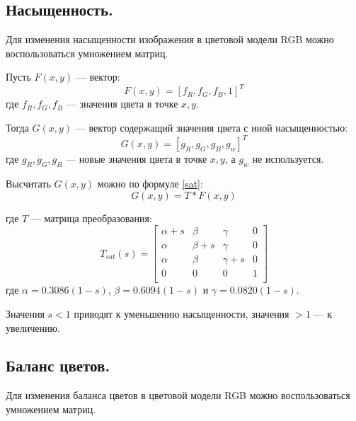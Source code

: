 \newpage


\subsection{Насыщенность.}

Для изменения насыщенности изображения в цветовой модели RGB можно воспользоваться умножением матриц.

Пусть $F(x,y)$ --- вектор:
\begin{equation}
	\label{F}
	F(x,y) = [f_R, f_G, f_B, 1]^T
\end{equation}
где $f_R, f_G, f_B$ --- значения цвета в точке $x,y$.

Тогда $G(x,y)$ --- вектор содержащий значения цвета с иной насыщенностью:
\begin{equation}
	\label{G}
	G(x,y) = [g_R, g_G, g_B, g_w]^T
\end{equation}
где $g_R, g_G, g_B$ --- новые значения цвета в точке $x,y$, а $g_w$ не используется.

Высчитать $G(x,y)$ можно по формуле \ref{sat}:
\begin{equation}
	\label{sat}
	G(x,y) = T * F(x,y)
\end{equation}

где $T$ --- матрица преобразования:
\begin{equation}
	\label{tsat}
	T_{sat}(s) = \begin{bmatrix}
					\alpha + s & \beta & \gamma & 0\\
				    \alpha & \beta + s & \gamma & 0 \\ 
					\alpha & \beta & \gamma + s & 0 \\ 
					0 & 0 & 0 & 1 \\ 
				\end{bmatrix}
\end{equation}
где $\alpha = 0.3086(1 - s)$, $\beta = 0.6094(1 - s)$ и $\gamma = 0.0820(1 - s)$.

Значения $s < 1$ приводят к уменьшению насыщенности, значения $> 1$ --- к увеличению. \cite{sat}


\subsection{Баланс цветов.}

Для изменения баланса цветов в цветовой модели RGB можно воспользоваться умножением матриц.

